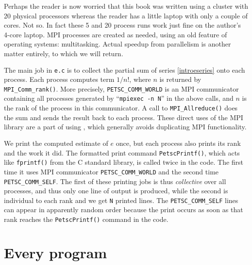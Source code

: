 
Perhaps the reader is now worried that this book was written using a cluster with 20 physical processors whereas the reader has a little laptop with only a couple of cores.  Not so.  In fact these 5 and 20 process runs work just fine on the author's 4-core laptop.  MPI processes are created as needed, using an old feature of operating systems: multitasking.  Actual speedup from parallelism is another matter entirely, to which we will return.

The main job in \texttt{e.c} is to collect the partial sum of series \eqref{introeseries} onto each process.  Each process computes term $1/n!$, where $n$ is returned by \texttt{MPI\_Comm\_rank()}.  More precisely, \texttt{PETSC\_COMM\_WORLD} is an MPI communicator \citep{Groppetal1999} containing all processes generated by ``\texttt{mpiexec -n N}'' in the above calls, and $n$ is the rank of the process in this communicator.  A call to \texttt{MPI\_Allreduce()} does the sum and sends the result back to each process.  These direct uses of the MPI library are a part of using \PETSc, which generally avoids duplicating MPI functionality.

We print the computed estimate of $e$ once, but each process also prints its rank and the work it did.  The formatted print command \texttt{PetscPrintf()}, which acts like \texttt{fprintf()} from the C standard library, is called twice in the code.  The first time it uses MPI communicator \texttt{PETSC\_COMM\_WORLD} and the second time \texttt{PETSC\_COMM\_SELF}.  The first of these printing jobs is thus \emph{collective} over all processes, and thus only one line of output is produced, while the second is individual to each rank  and we get \texttt{N} printed lines.  The \texttt{PETSC\_COMM\_SELF} lines can appear in apparently random order because the print occurs as soon as that rank reaches the \texttt{PetscPrintf()} command in the code.

\section{Every \PETSc program}

